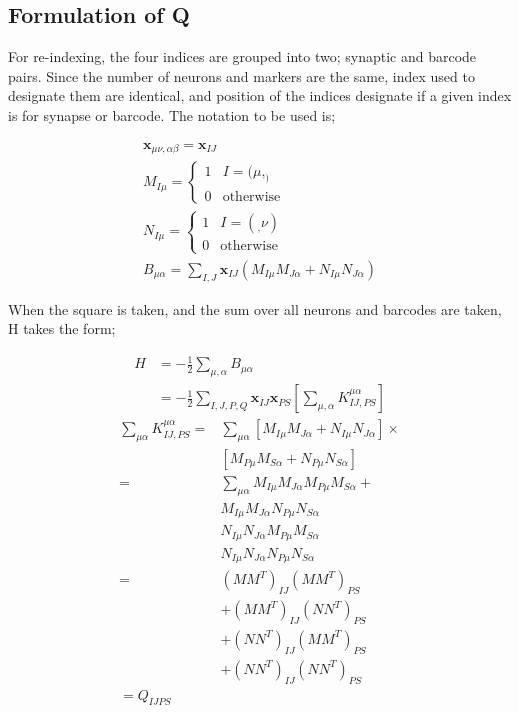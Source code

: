 \documentclass[%
 reprint,
 amsmath,amssymb,
 aps,
]{revtex4-1}
\begin{document}
\subsection{\label{sec2:q}Formulation of Q}
For re-indexing, the four indices are grouped into two; synaptic and barcode pairs. Since the number of neurons and markers are the same, index used to designate them are identical, and position of the indices designate if a given index is for synapse or barcode. The notation to be used is;

\begin{equation}
	\begin{aligned}
		\mathbf{x}_{\mu\nu,\alpha\beta} = \mathbf{x}_{IJ} \\
		M_{I\mu} = \begin{cases}
				1 & I = (\mu,_) \\
				0 & \textrm{otherwise}
			\end{cases} \\
			N_{I\mu} = \begin{cases}
			1 & I = (_,\nu) \\
			0 & \textrm{otherwise}
			\end{cases} \\
		B_{\mu\alpha} = \sum_{I, J} \mathbf{x}_{IJ} \left( M_{I\mu}M_{J\alpha} + N_{I\mu}N_{J\alpha} \right)
	\end{aligned}
\end{equation}

When the square is taken, and the sum over all neurons and barcodes are taken, H takes the form;

\begin{equation}
	\begin{split}
			H & = -\frac{1}{2} \sum_{\mu, \alpha} B_{\mu \alpha} \\
			  & = -\frac{1}{2} \sum_{I, J, P, Q} \mathbf{x}_{IJ}\mathbf{x}_{PS} \left[ \sum_{\mu, \alpha} K^{\mu\alpha}_{IJ,PS} \right]
	\end{split}
\end{equation}
\begin{equation}
	\begin{split}
		\sum_{\mu\alpha} K^{\mu\alpha}_{IJ,PS} = & \sum_{\mu\alpha} 
		\left[ M_{I\mu}M_{J\alpha} + N_{I\mu}N_{J\alpha} \right] \times \\
		& \left[ M_{P\mu}M_{S\alpha} + N_{P\mu}N_{S\alpha} \right] \\
		= & \sum_{\mu\alpha}  M_{I\mu}M_{J\alpha} M_{P\mu}M_{S\alpha} +\\
		  & M_{I\mu}M_{J\alpha} N_{P\mu}N_{S\alpha} \\
		  & N_{I\mu}N_{J\alpha} M_{P\mu}M_{S\alpha} \\
		  & N_{I\mu}N_{J\alpha} N_{P\mu}N_{S\alpha} \\
		= & (MM^T)_{IJ}(MM^T)_{PS} \\
		  & + (MM^T)_{IJ}(NN^T)_{PS} \\
		  & + (NN^T)_{IJ}(MM^T)_{PS} \\
		  & + (NN^T)_{IJ}(NN^T)_{PS} \\
		= Q_{IJPS}
	\end{split}
\end{equation}
\end{document}
